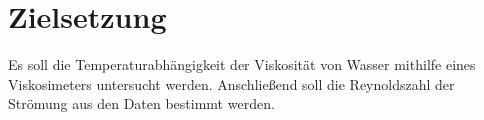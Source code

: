 
\section{Zielsetzung}
\label{sec:Zielsetzung}
 Es soll die Temperaturabhängigkeit der Viskosität von Wasser mithilfe eines
 Viskosimeters untersucht werden. Anschließend soll die Reynoldszahl der Strömung
 aus den Daten bestimmt werden.
